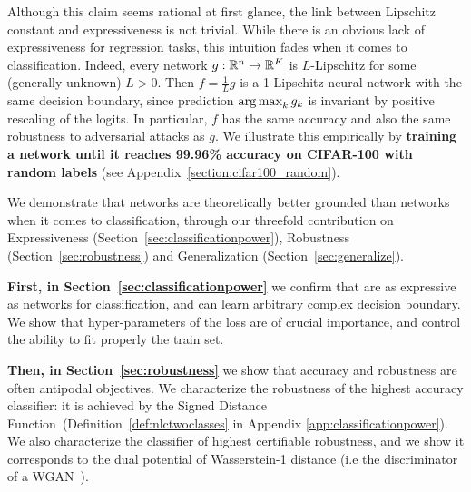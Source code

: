 Although this claim seems rational at first glance, the link between Lipschitz constant and expressiveness is not trivial. While there is an obvious lack of expressiveness for regression tasks, this intuition fades when it comes to classification. Indeed, every \LipInf network $g:\mathbb{R}^n\rightarrow\mathbb{R}^K$ is $L$-Lipschitz for some (generally unknown) $L>0$. Then $f=\frac{1}{L}g$ is a \mbox{1-Lipschitz} neural network with the same decision boundary, since prediction $\operatorname*{arg\,max}_k g_k$ is invariant by positive rescaling of the logits. In particular, $f$ has the same accuracy and also the same robustness to adversarial attacks as $g$. We illustrate this empirically by \textbf{training a \LipCl network until it reaches 99.96\% accuracy on CIFAR-100 with random labels} (see Appendix~\ref{section:cifar100_random}).  


We demonstrate that \LipCl networks are theoretically better grounded than \LipInf networks when it comes to classification, through our threefold contribution on Expressiveness (Section~\ref{sec:classificationpower}), Robustness (Section~\ref{sec:robustness}) and Generalization (Section~\ref{sec:generalize}).  

\textbf{First, in Section~\ref{sec:classificationpower}}  we confirm that \LipCl are as expressive as \LipInf networks for classification, and can learn arbitrary complex decision boundary. We show that hyper-parameters of the loss are of crucial importance, and control the ability to fit properly the train set.  
  
\textbf{Then, in Section~\ref{sec:robustness}} we show that accuracy and robustness are often antipodal objectives. We characterize the robustness of the highest accuracy \LipCl classifier: it is achieved by the Signed Distance Function~(Definition~\ref{def:nlctwoclasses} in Appendix \ref{app:classificationpower}). We also characterize the classifier of highest certifiable robustness, and we show it corresponds to the dual potential of Wasserstein-1 distance (i.e the discriminator of a WGAN~\cite{arjovsky2017wasserstein}).  %
  
